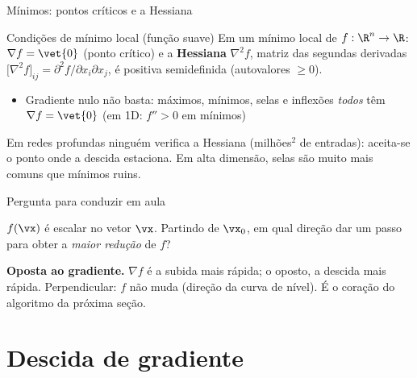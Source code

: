\documentclass[aspectratio=169, 11pt]{beamer}
\begin{document}
\begin{frame}{Mínimos: pontos críticos e a Hessiana}
  \begin{teobox}{Condições de mínimo local (função suave)}
    Em um mínimo local de $f : \R^n \to \R$:
    \(\nabla f = \vet{0}\) (ponto crítico) e a \textbf{Hessiana}
    \(\nabla^2 f\), matriz das segundas derivadas
    \(\big[\nabla^2 f\big]_{ij} = \partial^2 f / \partial x_i \partial x_j\),
    é \alert{positiva semidefinida} (autovalores $\geq 0$).
  \end{teobox}

  \begin{itemize}\setlength{\itemsep}{0.2ex}
    \item Gradiente nulo não basta: máximos, mínimos, selas e inflexões
          \emph{todos} têm $\nabla f = \vet{0}$ (em 1D: $f''>0$ em mínimos)
  \end{itemize}

  \begin{alertabox}
    Em redes profundas ninguém verifica a Hessiana (milhões$^2$ de entradas):
    aceita-se o ponto onde a descida estaciona. Em alta dimensão,
    \alert{selas} são muito mais comuns que mínimos ruins.
  \end{alertabox}
\end{frame}

\begin{frame}{Pergunta para conduzir em aula}
  \begin{quizbox}
    $f(\vx)$ é escalar no vetor $\vx$. Partindo de $\vx_0$, em qual direção
    dar um passo para obter a \emph{maior redução} de $f$?

    \smallskip
  \end{quizbox}

  \pause

  \begin{respbox}
    \textbf{Oposta ao gradiente.} $\nabla f$ é a subida mais rápida; o oposto,
    a descida mais rápida. Perpendicular: $f$ não muda (direção da curva de
    nível). É o coração do algoritmo da próxima seção.
  \end{respbox}
\end{frame}

\section{Descida de gradiente}
\end{document}
